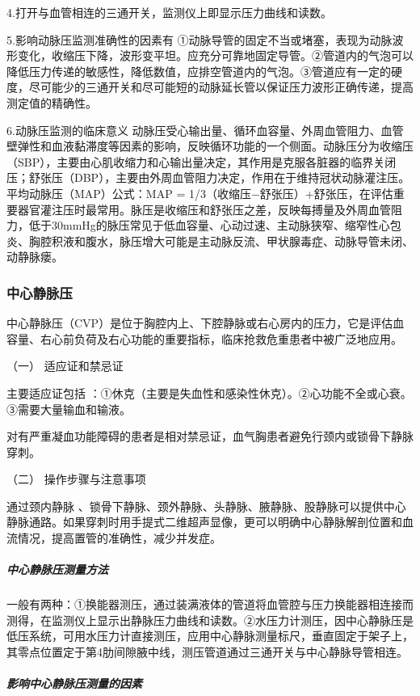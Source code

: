 4.打开与血管相连的三通开关，监测仪上即显示压力曲线和读数。

5.影响动脉压监测准确性的因素有
①动脉导管的固定不当或堵塞，表现为动脉波形变化，收缩压下降，波形变平坦。应充分可靠地固定导管。②管道内的气泡可以降低压力传递的敏感性，降低数值，应排空管道内的气泡。③管道应有一定的硬度，尽可能少的三通开关和尽可能短的动脉延长管以保证压力波形正确传递，提高测定值的精确性。

6.动脉压监测的临床意义
动脉压受心输出量、循环血容量、外周血管阻力、血管壁弹性和血液黏滞度等因素的影响，反映循环功能的一个侧面。动脉压分为收缩压（SBP），主要由心肌收缩力和心输出量决定，其作用是克服各脏器的临界关闭压；舒张压（DBP），主要由外周血管阻力决定，作用在于维持冠状动脉灌注压。平均动脉压（MAP）公式：MAP
=
1/3（收缩压−舒张压）+舒张压，在评估重要器官灌注压时最常用。脉压是收缩压和舒张压之差，反映每搏量及外周血管阻力，低于30mmHg的脉压常见于低血容量、心动过速、主动脉狭窄、缩窄性心包炎、胸腔积液和腹水，脉压增大可能是主动脉反流、甲状腺毒症、动脉导管未闭、动静脉瘘。

\subsubsection{中心静脉压}

中心静脉压（CVP）是位于胸腔内上、下腔静脉或右心房内的压力，它是评估血容量、右心前负荷及右心功能的重要指标，临床抢救危重患者中被广泛地应用。

\hypertarget{text00376.htmlux5cux23CHP16-6-4-1}{}
（一） 适应证和禁忌证

主要适应证包括
：①休克（主要是失血性和感染性休克）。②心功能不全或心衰。③需要大量输血和输液。

对有严重凝血功能障碍的患者是相对禁忌证，血气胸患者避免行颈内或锁骨下静脉穿刺。

\hypertarget{text00376.htmlux5cux23CHP16-6-4-2}{}
（二） 操作步骤与注意事项

通过颈内静脉
、锁骨下静脉、颈外静脉、头静脉、腋静脉、股静脉可以提供中心静脉通路。如果穿刺时用手提式二维超声显像，更可以明确中心静脉解剖位置和血流情况，提高置管的准确性，减少并发症。

\subparagraph{中心静脉压测量方法}

一般有两种：①换能器测压，通过装满液体的管道将血管腔与压力换能器相连接而测得，在监测仪上显示出静脉压力曲线和读数。②水压力计测压，因中心静脉压是低压系统，可用水压力计直接测压，应用中心静脉测量标尺，垂直固定于架子上，其零点位置定于第4肋间隙腋中线，测压管道通过三通开关与中心静脉导管相连。

\subparagraph{影响中心静脉压测量的因素}

